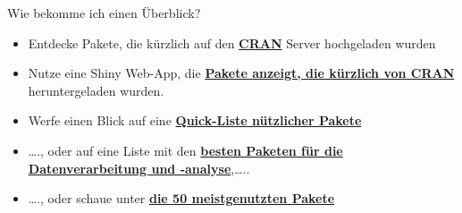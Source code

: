 \documentclass[ignorenonframetext,]{beamer}
\begin{document}
\begin{frame}{Wie bekomme ich einen Überblick?}

\begin{itemize}
\item
  Entdecke Pakete, die kürzlich auf den
  \href{https://mran.microsoft.com/packages/}{\textbf{CRAN}} Server
  hochgeladen wurden
\item
  Nutze eine Shiny Web-App, die
  \href{https://gallery.shinyapps.io/cran-gauge/}{\textbf{Pakete
  anzeigt, die kürzlich von CRAN}} heruntergeladen wurden.
\item
  Werfe einen Blick auf eine
  \href{https://support.rstudio.com/hc/en-us/articles/201057987-Quick-list-of-useful-R-packages}{\textbf{Quick-Liste
  nützlicher Pakete}}
\item
  \ldots{}., oder auf eine Liste mit den
  \href{http://www.computerworld.com/article/2921176/business-intelligence/great-r-packages-for-data-import-wrangling-visualization.html}{\textbf{besten
  Paketen für die Datenverarbeitung und -analyse}},\ldots{}..
\item
  \ldots{}., oder schaue unter
  \href{https://www.r-bloggers.com/the-50-most-used-r-packages/}{\textbf{die
  50 meistgenutzten Pakete}}
\end{itemize}

\end{frame}
\end{document}
